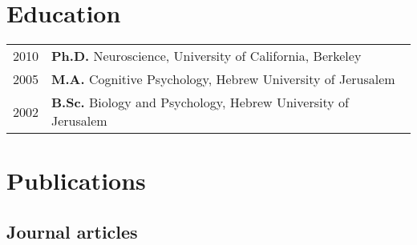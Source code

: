 \documentclass[11pt, a4paper]{article} %
\begin{document}
\section*{Education}

\begin{tabular}{ll}
	2010 & {\bf Ph.D. } Neuroscience, University of California, Berkeley \\
	2005 & {\bf M.A.} Cognitive Psychology, Hebrew University of Jerusalem \\
	2002 & {\bf B.Sc.} Biology and Psychology, Hebrew University of Jerusalem \\
\end{tabular}

\section*{Publications}

\subsection*{Journal articles}
\end{document}
